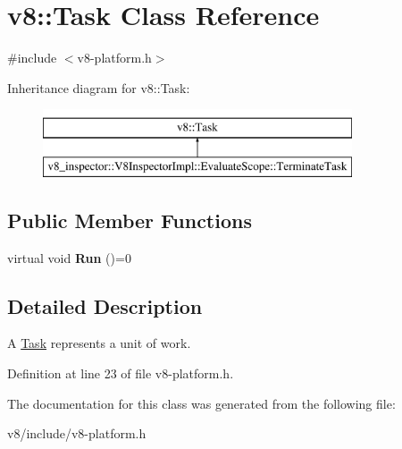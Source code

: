 \hypertarget{classv8_1_1Task}{}\section{v8\+:\+:Task Class Reference}
\label{classv8_1_1Task}


{\ttfamily \#include $<$v8-\/platform.\+h$>$}

Inheritance diagram for v8\+:\+:Task\+:\begin{figure}[H]
\begin{center}
\leavevmode
\includegraphics[height=2.000000cm]{classv8_1_1Task}
\end{center}
\end{figure}
\subsection*{Public Member Functions}
\begin{DoxyCompactItemize}
\item 
\mbox{\label{classv8_1_1Task_a6bd5bda0e357fcc2e727bf7b0170f99a}} 
virtual void {\bfseries Run} ()=0
\end{DoxyCompactItemize}


\subsection{Detailed Description}
A \mbox{\hyperlink{classv8_1_1Task}{Task}} represents a unit of work. 

Definition at line 23 of file v8-\/platform.\+h.



The documentation for this class was generated from the following file\+:\begin{DoxyCompactItemize}
\item 
v8/include/v8-\/platform.\+h\end{DoxyCompactItemize}
